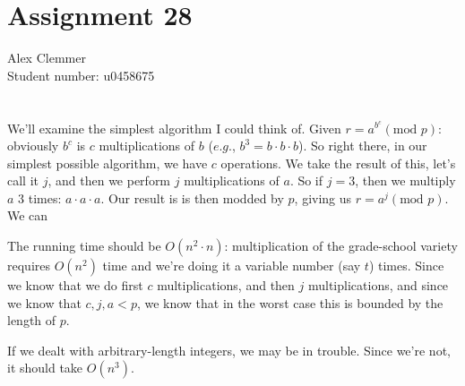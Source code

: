 \documentclass[a4paper]{article}
\begin{document}
\section*{Assignment 28}
Alex Clemmer\\
Student number: u0458675

\section*{}

We'll examine the simplest algorithm I could think of. Given $r = a^{b^c} (\mbox{mod } p)$: obviously $b^c$ is $c$ multiplications of $b$ ($\textit{e.g.}$, $b^3 = b \cdot b \cdot b$). So right there, in our simplest possible algorithm, we have $c$ operations. We take the result of this, let's call it $j$, and then we perform $j$ multiplications of $a$. So if $j=3$, then we multiply $a$ 3 times: $a \cdot a \cdot a$. Our result is is then modded by $p$, giving us $r = a^j (\mbox{mod } p)$. We can 

The running time should be $O(n^2 \cdot n)$: multiplication of the grade-school variety requires $O(n^2)$ time and we're doing it a variable number (say $t$) times. Since we know that we do first $c$ multiplications, and then $j$ multiplications, and since we know that $c, j, a < p$, we know that in the worst case this is bounded by the length of $p$.

If we dealt with arbitrary-length integers, we may be in trouble. Since we're not, it should take $O(n^3)$.
\end{document}
